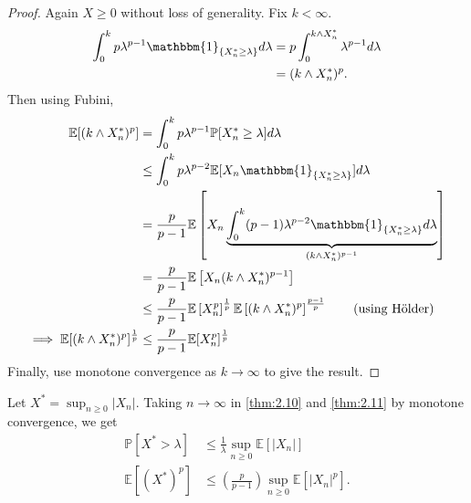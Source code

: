 \documentclass{article}
\newcommand{\1}[1]{\mathbbm{1}_{#1}}
\newcommand{\Prob}{\mathbb{P}}
\newcommand{\E}{\mathbb{E}}
\begin{document}
\begin{proof}
  Again $X \geq 0$ without loss of generality. Fix $k < \infty$.
  \begin{align*}
    \int_0^k p \lambda^{p-1} \1{\{X_n^* \geq \lambda\}} d\lambda &= p \int_0^{k \land X_n^*} \lambda^{p-1} d\lambda  \\
                                                                 &= (k \land X_n^*)^p
  .\end{align*}
  Then using Fubini,
  \begin{align*}
    \E[(k \land X_n^*)^p] &= \int_0^k p \lambda^{p-1} \Prob[X_n^* \geq \lambda] d \lambda \\
                         &\leq \int_0^k p \lambda^{p-2} \E[X_n \1{\{X_n^* \geq \lambda\}}] d \lambda \\
                         &= \frac{p}{p-1} \E\left[X_n \underbrace{\int_0^k (p-1) \lambda^{p-2} \1{\{X_n^* \geq \lambda\}} d \lambda}_{(k \land X_n^*)^{p-1}}\right] \\
                         &= \frac{p}{p-1} \E\left[X_n (k \land X_n^*)^{p-1}\right] \\
                         &\leq \frac{p}{p-1} \E\left[X_n^p\right]^{\frac{1}{p}} \E\left[(k \land X_n^*)^p\right]^{\frac{p-1}{p}} \tag{using H\"older} \\
    \implies \E[(k \land X_n^*)^p]^{\frac{1}{p}} &\leq \frac{p}{p-1} \E[X_n^p]^{\frac{1}{p}}
  \end{align*}
  Finally, use monotone convergence as $k \to \infty$ to give the result.
\end{proof}
Let $X^* = \sup_{n \geq 0} |X_n|$. Taking $n \to \infty$ in \cref{thm:2.10} and \cref{thm:2.11} by monotone convergence, we get
\begin{align*}
  \Prob[X^* > \lambda] &\leq \frac{1}{\lambda} \sup_{n \geq 0} \E[|X_n|] \\
  \E[(X^*)^p] &\leq \left(\frac{p}{p-1}\right) \sup_{n \geq 0} \E[|X_n|^p]
.\end{align*}
\printindex
\end{document}
